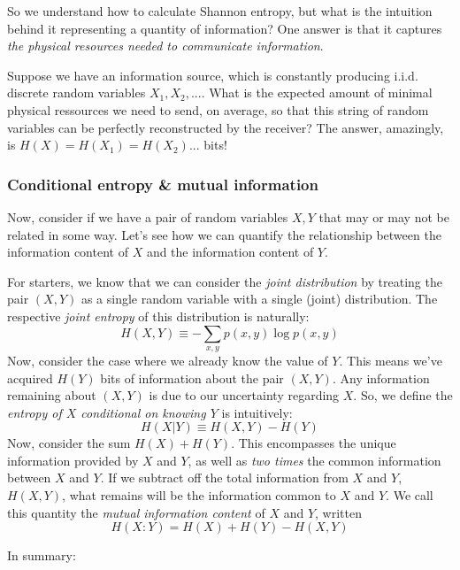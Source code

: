 \documentclass[a4paper,12pt]{article}
\begin{document}
So we understand how to calculate Shannon entropy, but what is the intuition behind it representing a quantity of information?
One answer is that it captures \emph{the physical resources needed to communicate information}.

Suppose we have an information source, which is constantly producing i.i.d. discrete random variables $X_1,X_2,...$.
What is the expected amount of minimal physical ressources we need to send, on average, so that this string of random variables can be perfectly reconstructed by the receiver?
The answer, amazingly, is $H(X)=H(X_1)=H(X_2)...$ bits!

\subsubsection{Conditional entropy \& mutual information}

Now, consider if we have a pair of random variables $X,Y$ that may or may not be related in some way.
Let's see how we can quantify the relationship between the information content of $X$ and the information content of $Y$.

For starters, we know that we can consider the \emph{joint distribution} by treating the pair $(X,Y)$ as a single random variable with a single (joint) distribution.
The respective \emph{joint entropy} of this distribution is naturally:
$$H(X,Y) \equiv  -\sum_{x,y}p(x,y)\log p(x,y)$$
Now, consider the case where we already know the value of $Y$.
This means we've acquired $H(Y)$ bits of information about the pair $(X,Y)$.
Any information remaining about $(X,Y)$ is due to our uncertainty regarding $X$.
So, we define the \emph{entropy of $X$ conditional on knowing $Y$} is intuitively:
$$H(X|Y) \equiv H(X,Y) - H(Y)$$
Now, consider the sum $H(X)+H(Y)$.
This encompasses the unique information provided by $X$ and $Y$, as well as \emph{two times} the common information between $X$ and $Y$.
If we subtract off the total information from $X$ and $Y$, $H(X,Y)$, what remains will be the information common to $X$ and $Y$.
We call this quantity the \emph{mutual information content} of $X$ and $Y$, written
$$H(X:Y)=H(X) + H(Y) - H(X,Y)$$ 

In summary:
\end{document}
